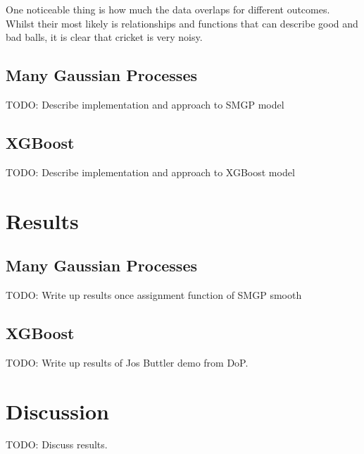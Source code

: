 \documentclass[12pt,a4paper]{report}
\theoremstyle{definition}
\begin{document}
One noticeable thing is how much the data overlaps for different outcomes. 
Whilst their most likely is relationships and functions that can describe good and bad balls, it is clear that cricket is very noisy.

\section{Many Gaussian Processes}

TODO: Describe implementation and approach to SMGP model

\citep{GPflow2017}

\section{XGBoost}

TODO: Describe implementation and approach to XGBoost model

\chapter{Results}

\section{Many Gaussian Processes}

TODO: Write up results once assignment function of SMGP smooth

\section{XGBoost}

TODO: Write up results of Jos Buttler demo from DoP.

\chapter{Discussion}

TODO: Discuss results.

\end{document}
